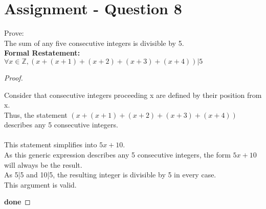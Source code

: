 \documentclass{article}
\begin{document}
\section*{Assignment - Question 8}
Prove:\\
The sum of any five consecutive integers is divisible by 5.\\
\textbf{Formal Restatement:}
$\forall x \in \mathbb{Z}, (x+(x+1)+(x+2)+(x+3)+(x+4))|5$
\begin{proof}
  \begin{addmargin}{1em}
  Consider that consecutive integers proceeding x are defined by their position from x.\\
  Thus, the statement $(x+(x+1)+(x+2)+(x+3)+(x+4))$ describes any 5 consecutive integers.\\\\
  This statement simplifies into $5x+10$.\\
  As this generic expression describes any 5 consecutive integers, the form $5x+10$ will always be the result.\\
  As 5|5 and 10|5, the resulting integer is divisible by 5 in every case.\\
  This argument is valid.
  \end{addmargin}
  \textbf{done}
\end{proof}
\end{document}
